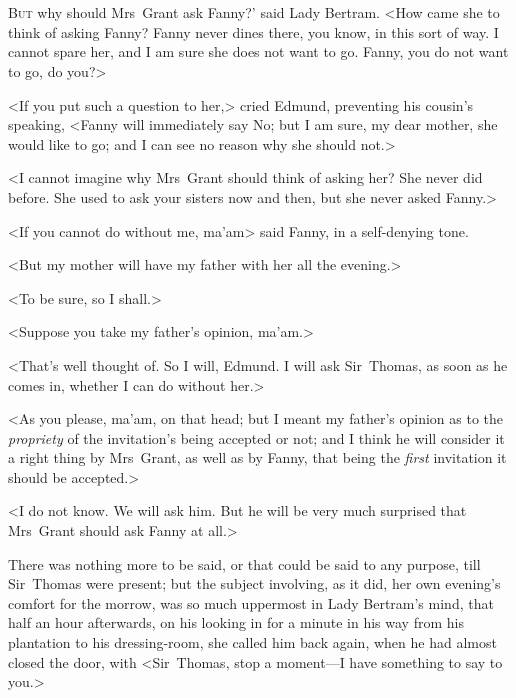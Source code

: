 \chapter[Chapter \thechapter]{}
	
\lettrine[ante=`,lraise=0.3]{B}{ut} why should Mrs~Grant ask Fanny?' said Lady Bertram. <How came she to think of asking Fanny? Fanny never dines there, you know, in this sort of way. I cannot spare her, and I am sure she does not want to go. Fanny, you do not want to go, do you?>

<If you put such a question to her,> cried Edmund, preventing his cousin's speaking, <Fanny will immediately say No; but I am sure, my dear mother, she would like to go; and I can see no reason why she should not.>

<I cannot imagine why Mrs~Grant should think of asking her? She never did before. She used to ask your sisters now and then, but she never asked Fanny.>

<If you cannot do without me, ma'am\longdash> said Fanny, in a self-denying tone.

<But my mother will have my father with her all the evening.>

<To be sure, so I shall.>

<Suppose you take my father's opinion, ma'am.>

<That's well thought of. So I will, Edmund. I will ask Sir~Thomas, as soon as he comes in, whether I can do without her.>

<As you please, ma'am, on that head; but I meant my father's opinion as to the \textit{propriety}  of the invitation's being accepted or not; and I think he will consider it a right thing by Mrs~Grant, as well as by Fanny, that being the \textit{first}  invitation it should be accepted.>

<I do not know. We will ask him. But he will be very much surprised that Mrs~Grant should ask Fanny at all.>

There was nothing more to be said, or that could be said to any purpose, till Sir~Thomas were present; but the subject involving, as it did, her own evening's comfort for the morrow, was so much uppermost in Lady Bertram's mind, that half an hour afterwards, on his looking in for a minute in his way from his plantation to his dressing-room, she called him back again, when he had almost closed the door, with <Sir~Thomas, stop a moment—I have something to say to you.>

